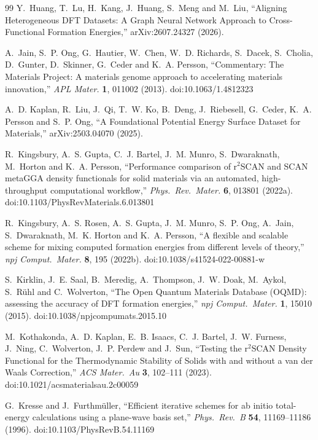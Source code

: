 \documentclass[11pt]{article}
\begin{document}
\begin{thebibliography}{99}
 Y.~Huang, T.~Lu, H.~Kang, J.~Huang, S.~Meng and
M.~Liu, ``Aligning Heterogeneous DFT Datasets: A Graph Neural Network Approach to
Cross-Functional Formation Energies,'' arXiv:2607.24327 (2026).

 A.~Jain, S.~P. Ong, G.~Hautier, W.~Chen,
W.~D. Richards, S.~Dacek, S.~Cholia, D.~Gunter, D.~Skinner, G.~Ceder and K.~A. Persson,
``Commentary: The Materials Project: A materials genome approach to accelerating materials
innovation,'' \emph{APL Mater.} \textbf{1}, 011002 (2013). doi:10.1063/1.4812323

 A.~D. Kaplan, R.~Liu, J.~Qi, T.~W. Ko, B.~Deng,
J.~Riebesell, G.~Ceder, K.~A. Persson and S.~P. Ong, ``A Foundational Potential Energy
Surface Dataset for Materials,'' arXiv:2503.04070 (2025).

 R.~Kingsbury, A.~S. Gupta,
C.~J. Bartel, J.~M. Munro, S.~Dwaraknath, M.~Horton and K.~A. Persson, ``Performance
comparison of r$^2$SCAN and SCAN metaGGA density functionals for solid materials via an
automated, high-throughput computational workflow,'' \emph{Phys.~Rev.~Mater.}
\textbf{6}, 013801 (2022a). doi:10.1103/PhysRevMaterials.6.013801

 R.~Kingsbury, A.~S. Rosen, A.~S. Gupta,
J.~M. Munro, S.~P. Ong, A.~Jain, S.~Dwaraknath, M.~K. Horton and K.~A. Persson, ``A
flexible and scalable scheme for mixing computed formation energies from different levels
of theory,'' \emph{npj Comput.~Mater.} \textbf{8}, 195 (2022b).
doi:10.1038/s41524-022-00881-w

 S.~Kirklin, J.~E. Saal, B.~Meredig,
A.~Thompson, J.~W. Doak, M.~Aykol, S.~R\"uhl and C.~Wolverton, ``The Open Quantum Materials
Database (OQMD): assessing the accuracy of DFT formation energies,''
\emph{npj Comput.~Mater.} \textbf{1}, 15010 (2015). doi:10.1038/npjcompumats.2015.10

 M.~Kothakonda, A.~D. Kaplan,
E.~B. Isaacs, C.~J. Bartel, J.~W. Furness, J.~Ning, C.~Wolverton, J.~P. Perdew and J.~Sun,
``Testing the r$^2$SCAN Density Functional for the Thermodynamic Stability of Solids with
and without a van der Waals Correction,'' \emph{ACS Mater.~Au} \textbf{3}, 102--111 (2023).
doi:10.1021/acsmaterialsau.2c00059

 G.~Kresse and J.~Furthm\"uller,
``Efficient iterative schemes for ab initio total-energy calculations using a plane-wave
basis set,'' \emph{Phys.~Rev.~B} \textbf{54}, 11169--11186 (1996).
doi:10.1103/PhysRevB.54.11169


\end{thebibliography}
\end{document}
